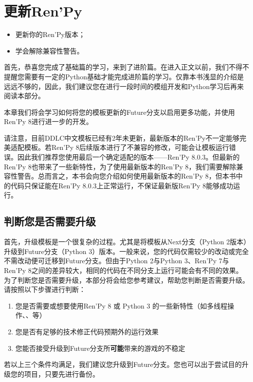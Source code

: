 \chapter{更新Ren'Py}

\begin{ChapterGoals}
    \begin{itemize}
        \item 更新你的Ren'Py版本；
        \item 学会解除兼容性警告。
    \end{itemize}
\end{ChapterGoals}

首先，恭喜您完成了基础篇的学习，来到了进阶篇。在进入正文以前，我们不得不提醒您需要有一定的Python基础才能完成进阶篇的学习。仅靠本书浅显的介绍是远远不够的，因此，我们建议您在进行一段时间的模组开发和Python学习后再来阅读本部分。

本章我们将会学习如何将您的模板更新的Future分支以启用更多功能，并使用Ren'Py 8进行进一步的开发。

\begin{Warning}
    请注意，目前DDLC中文模板已经有2年未更新，最新版本的Ren'Py不一定能够完美适配模板。若Ren'Py 8后续版本进行了不兼容的修改，可能会让模板运行错误。因此我们推荐您使用最后一个确定适配的版本——Ren'Py 8.0.3。但最新的Ren'Py 8也带来了一些新特性，为了使用最新版本的Ren'Py 8，我们需要解除兼容性警告。总而言之，本书会向您介绍如何使用最新版本的Ren'Py 8，但本书中的代码只保证能在Ren'Py 8.0.3上正常运行，不保证最新版Ren'Py 8能够成功运行。
\end{Warning}

\section{判断您是否需要升级}
首先，升级模板是一个很复杂的过程。尤其是将模板从Next分支（Python 2版本）升级到Future分支（Python 3）版本。一般来说，您的代码仅需较少的改动或完全不需改动便可迁移到Future分支。但由于Python 2与Python 3、Ren'Py 7与Ren'Py 8之间的差异较大，相同的代码在不同分支上运行可能会有不同的效果。为了判断您是否需要升级，本部分将会给您参考建议，帮助您判断是否需要升级。
请按照以下步骤进行判断：
\begin{enumerate}
    \item 您是否需要或想要使用Ren'Py 8 或 Python 3 的一些新特性（如多线程操作、、等）
    \item 您是否有足够的技术修正代码预期外的运行效果
    \item 您能否接受升级到Future分支所\textbf{可能}带来的游戏的不稳定
\end{enumerate}
若以上三个条件均满足，我们建议您升级到Future分支。您也可以出于尝试目的升级您的项目，只要先进行备份。

